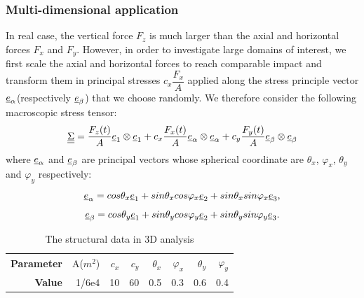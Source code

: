 \documentclass[xcolor=table]{Bredelebeamer}
\begin{document}
\begin{frame}
	\frametitle{Multi-dimensional application}
 In real case, the vertical force $F_z$ is much larger than the axial and horizontal forces $F_x$ and $F_y$. However, in order to investigate large domains of interest, we first scale the axial and horizontal forces to reach comparable impact and transform them in principal stresses $c_x\dfrac{F_x}{A}$ applied along the stress principle vector $\uline{e}_\alpha$(respectively $\uline{e}_\beta$) that we choose randomly. We therefore consider the following macroscopic stress tensor:
 \begin{equation}
 \uline{\uline{\Sigma}}=\dfrac{F_z(t)}{A}\uline{e}_1\otimes \uline{e}_1+c_x\dfrac{F_x(t)}{A}\uline{e}_{\alpha}\otimes \uline{e}_{\alpha}+c_y\dfrac{F_y(t)}{A}\uline{e}_{\beta}\otimes \uline{e}_{\beta}
 \label{tensor1}
 \end{equation}
 where $\uline{e}_{\alpha}$  and $\uline{e}_{\beta}$ are principal vectors whose spherical coordinate are $\theta_x$, $\varphi_x$,  $\theta_y$ and $\varphi_y$ respectively:
 $$\uline{e}_{\alpha}=cos\theta_x\uline{e}_1+sin\theta_xcos\varphi_x\uline{e}_2+sin\theta_xsin\varphi_x\uline{e}_3,$$
 $$\uline{e}_{\beta}=cos\theta_y\uline{e}_1+sin\theta_ycos\varphi_y\uline{e}_2+sin\theta_ysin\varphi_y\uline{e}_3.$$
 
 \begin{table}[!h]
 	\centering
 	\begin{tabular}{rrrrrrrr}
 		\hline
 		\textbf{Parameter} & A($m^2$) & $c_x$ & $c_y$ & $\theta_x$ & $\varphi_x$ & $\theta_y$ & $\varphi_y$ \\
 		\textbf{Value}      & 1/6e4                  & 10    & 60    & 0.5        & 0.3         & 0.6        & 0.4         \\ \hline
 	\end{tabular}
 	\caption{The structural data in 3D analysis}
 	\label{structural}
 \end{table}

\end{frame}
\end{document}
